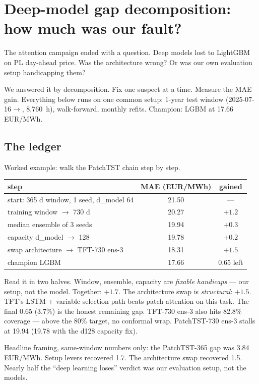 \section{Deep-model gap decomposition: how much was our fault?}

The attention campaign ended with a question. Deep models lost to
LightGBM on PL day-ahead price. Was the architecture wrong? Or was our
own evaluation setup handicapping them?

We answered it by decomposition. Fix one suspect at a time. Measure the
MAE gain. Everything below runs on one common setup: 1-year test window
(2025-07-16$\to$, 8,760~h), walk-forward, monthly refits. Champion:
LGBM at 17.66 EUR/MWh.

\subsection{The ledger}

Worked example: walk the PatchTST chain step by step.

\begin{center}
\begin{tabular}{lcc}
\toprule
step & MAE (EUR/MWh) & gained \\
\midrule
start: 365 d window, 1 seed, d\_model 64 & 21.50 & --- \\
training window $\to$ 730 d & 20.27 & $+1.2$ \\
median ensemble of 3 seeds & 19.94 & $+0.3$ \\
capacity d\_model $\to$ 128 & 19.78 & $+0.2$ \\
swap architecture $\to$ TFT-730 ens-3 & 18.31 & $+1.5$ \\
champion LGBM & 17.66 & 0.65 left \\
\bottomrule
\end{tabular}
\end{center}

Read it in two halves. Window, ensemble, capacity are \emph{fixable
handicaps} --- our setup, not the model. Together: $+1.7$. The
architecture swap is \emph{structural}: $+1.5$. TFT's LSTM +
variable-selection path beats patch attention on this task. The final
0.65 (3.7\%) is the honest remaining gap. TFT-730 ens-3 also hits
82.8\% coverage --- above the 80\% target, no conformal wrap.
PatchTST-730 ens-3 stalls at 19.94 (19.78 with the d128 capacity fix).

Headline framing, same-window numbers only: the PatchTST-365 gap was
3.84 EUR/MWh. Setup levers recovered 1.7. The architecture swap
recovered 1.5. Nearly half the ``deep learning loses'' verdict was our
evaluation setup, not the models.

